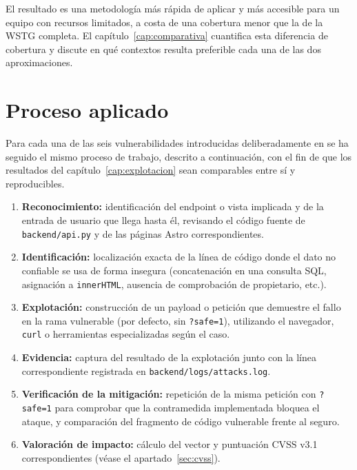 El resultado es una metodología más rápida de aplicar y más accesible para
un equipo con recursos limitados, a costa de una cobertura menor que la de
la WSTG completa. El capítulo~\ref{cap:comparativa} cuantifica esta
diferencia de cobertura y discute en qué contextos resulta preferible cada
una de las dos aproximaciones.

\section{Proceso aplicado}
\label{sec:proceso}

Para cada una de las seis vulnerabilidades introducidas deliberadamente en \breachlab se ha
seguido el mismo proceso de trabajo, descrito a continuación, con el fin de
que los resultados del capítulo~\ref{cap:explotacion} sean comparables entre
sí y reproducibles.

\begin{enumerate}
\item \textbf{Reconocimiento:} identificación del endpoint o vista implicada
  y de la entrada de usuario que llega hasta él, revisando el código fuente
  de \texttt{backend/api.py} y de las páginas Astro correspondientes.
\item \textbf{Identificación:} localización exacta de la línea de código
  donde el dato no confiable se usa de forma insegura (concatenación en una
  consulta SQL, asignación a \verb|innerHTML|, ausencia de comprobación de
  propietario, etc.).
\item \textbf{Explotación:} construcción de un payload o petición que
  demuestre el fallo en la rama vulnerable (por defecto, sin
  \texttt{?safe=1}), utilizando el navegador, \texttt{curl} o herramientas
  especializadas según el caso.
\item \textbf{Evidencia:} captura del resultado de la explotación junto con
  la línea correspondiente registrada en \texttt{backend/logs/attacks.log}.
\item \textbf{Verificación de la mitigación:} repetición de la misma
  petición con \texttt{?safe=1} para comprobar que la contramedida
  implementada bloquea el ataque, y comparación del fragmento de código
  vulnerable frente al seguro.
\item \textbf{Valoración de impacto:} cálculo del vector y puntuación
  CVSS v3.1 correspondientes (véase el apartado~\ref{sec:cvss}).
\end{enumerate}

